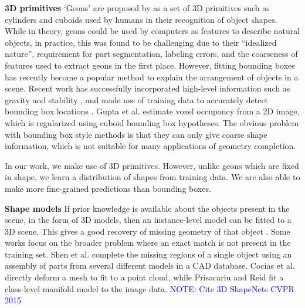 \documentclass[10pt,twocolumn,letterpaper]{article}
\makeatletter
\newcommand*{\ea}{et al.\@\xspace}
\newcommand{\note}[1]{\textcolor{blue}{NOTE: #1}}
\renewcommand{\paragraph}{\vspace{2pt}\noindent\textbf}
\makeatother
\begin{document}
\paragraph{3D primitives}\newline
`Geons' are proposed by \cite{bieberman-rbc-1987} as a set of 3D primitives such as cylinders and cuboids used by humans in their recognition of object shapes.
While in theory, geons could be used by computers  as features to describe natural objects, in practice, this was found to be challenging \cite{dickinson-iavc-1997} due to their ``idealized nature'', requirement for part segmentation, labeling errors, and the coarseness of features used to extract geons in the first place.
However, fitting bounding boxes has recently become a popular method to explain the arrangement of objects in a scene.
Recent work has successfully incorporated high-level information such as gravity and stability
 \cite{shao-siggraphasia-2014, jia-cvpr-2013}, and made use of training data to accurately detect bounding box locations \cite{hedau-cvpr-2012}.
Gupta \ea \cite{gupta-cvpr-2011} estimate voxel occupancy from a 2D image, which is regularized using cuboid bounding box hypotheses.
The obvious problem with bounding box style methods is that they can only give coarse shape information, which is not suitable for many applications of geometry completion.

In our work, we make use of 3D primitives.
However, unlike geons which are fixed in shape, we learn a distribution of shapes from training data.
We are also able to make more fine-grained predictions than bounding boxes.


\paragraph{Shape models}\newline
If prior knowledge is available about the objects present in the scene, in the form of 3D models, then an instance-level model can be fitted to a 3D scene.
This gives a good recovery of missing geometry of that object \cite{hinterstoisser-accv-2012, drost-3dimpvt-2012}.
Some works focus on the broader problem where an exact match is not present in the training set.
Shen \ea \cite{shen-tog-2012} complete the missing regions of a single object using an assembly of parts from several different models in a CAD database.
Cocias \ea \cite{cocias-cgvcv-2013} directly deform a mesh to fit to a point cloud, while Prisacariu and Reid \cite{prisacariu-iccv-2011} fit a class-level manifold model to the image data.
\note{Cite 3D ShapeNets CVPR 2015}
\end{document}
